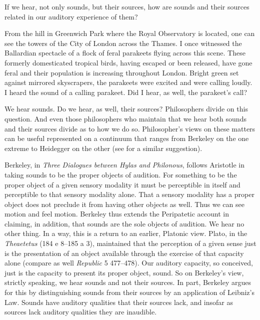 If we hear, not only sounds, but their sources, how are sounds and their sources related in our auditory experience of them?

From the hill in Greenwich Park where the Royal Observatory is located, one can see the towers of the City of London across the Thames. I once witnessed the Ballardian spectacle of a flock of feral parakeets flying across this scene. These formerly domesticated tropical birds, having escaped or been released, have gone feral and their population is increasing throughout London. Bright green set against mirrored skyscrapers, the parakeets were excited and were calling loudly. I heard the sound of a calling parakeet. Did I hear, as well, the parakeet's call?

We hear sounds. Do we hear, as well, their sources? Philosophers divide on this question. And even those philosophers who maintain that we hear both sounds and their sources divide as to how we do so. Philosopher's views on these matters can be useful represented on a continuum that ranges from Berkeley on the one extreme to Heidegger on the other (see \citealt{Leddington:2014aa} for a similar suggestion). 

\nocite{Berkeley:1734fk} Berkeley, in \emph{Three Dialogues between Hylas and Philonous}, follows Aristotle in taking sounds to be the proper objects of audition. For something to be the proper object of a given sensory modality it must be perceptible in itself and perceptible to that sensory modality alone. That a sensory modality has a proper object does not preclude it from having other objects as well. Thus we can see motion and feel motion. Berkeley thus extends the Peripatetic account in claiming, in addition, that sounds are the sole objects of audition. We hear no other thing. In a way, this is a return to an earlier, Platonic view. Plato, in the \emph{Theaetetus} (184 e 8--185 a 3), maintained that the perception of a given sense just is the presentation of an object available through the exercise of that capacity alone (compare as well \emph{Republic} 5 477--478). Our auditory capacity, so conceived, just is the capacity to present its proper object, sound. So on Berkeley's view, strictly speaking, we hear sounds and not their sources. In part, Berkeley argues for this by distinguishing sounds from their sources by an application of Leibniz's Law. Sounds have auditory qualities that their sources lack, and insofar as sources lack auditory qualities they are inaudible. 

